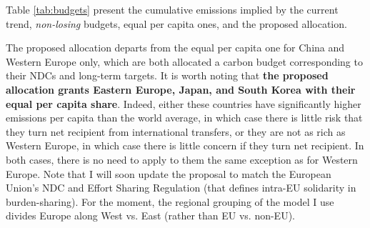\documentclass[12pt,english]{article}
\begin{document}
Table \ref{tab:budgets} present the cumulative emissions implied by the current trend, \textit{non-losing} budgets, equal per capita ones, and the proposed allocation. 

The proposed allocation departs from the equal per capita one for China and Western Europe only, which are both allocated a carbon budget corresponding to their NDCs and long-term targets. %
It is worth noting that \textbf{the proposed allocation grants Eastern Europe, Japan, and South Korea with their equal per capita share}. 
Indeed, either these countries have significantly higher emissions per capita than the world average, in which case there is little risk that they turn net recipient from international transfers, or they are not as rich as Western Europe, in which case there is little concern if they turn net recipient. In both cases, there is no need to apply to them the same exception as for Western Europe. Note that I will soon update the proposal to match the European Union's NDC and Effort Sharing Regulation (that defines intra-EU solidarity in burden-sharing). %
For the moment, the regional grouping of the model I use divides Europe along West vs. East (rather than EU vs. non-EU). %
\end{document}

